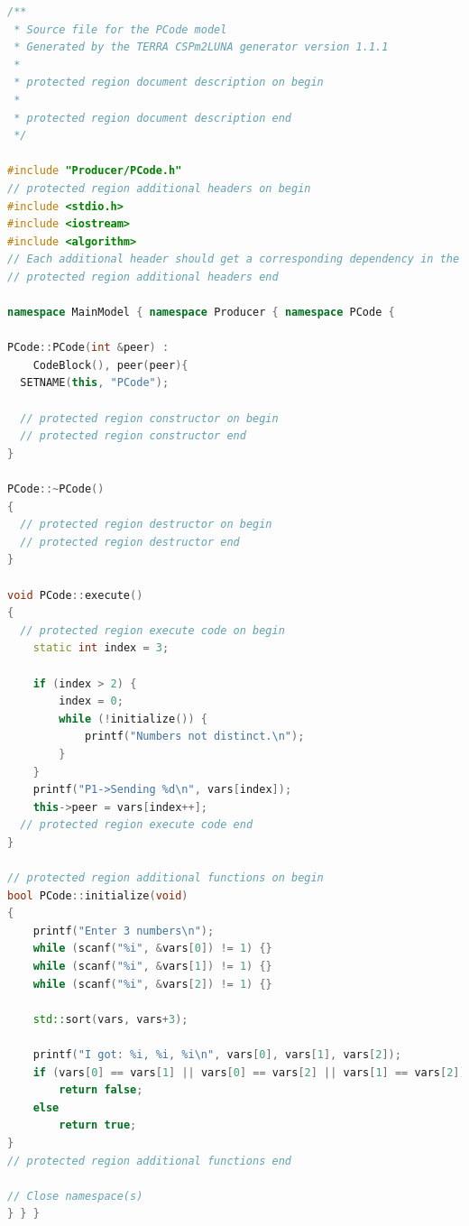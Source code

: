 \documentclass[a4paper,twoside,11pt]{article}
\begin{document}
\begin{lstlisting}[caption=Producer/PCode.cpp, label=code:2_1PCode, language=C++]
/**
 * Source file for the PCode model
 * Generated by the TERRA CSPm2LUNA generator version 1.1.1
 *
 * protected region document description on begin
 *
 * protected region document description end
 */

#include "Producer/PCode.h"
// protected region additional headers on begin
#include <stdio.h>
#include <iostream>
#include <algorithm>
// Each additional header should get a corresponding dependency in the Makefile
// protected region additional headers end

namespace MainModel { namespace Producer { namespace PCode { 

PCode::PCode(int &peer) :
    CodeBlock(), peer(peer){
  SETNAME(this, "PCode");

  // protected region constructor on begin
  // protected region constructor end
}

PCode::~PCode()
{
  // protected region destructor on begin
  // protected region destructor end
}

void PCode::execute()
{
  // protected region execute code on begin
	static int index = 3;

	if (index > 2) {
		index = 0;
		while (!initialize()) {
			printf("Numbers not distinct.\n");
		}
	}
	printf("P1->Sending %d\n", vars[index]);
	this->peer = vars[index++];
  // protected region execute code end
}

// protected region additional functions on begin
bool PCode::initialize(void)
{
	printf("Enter 3 numbers\n");
	while (scanf("%i", &vars[0]) != 1) {}
	while (scanf("%i", &vars[1]) != 1) {}
	while (scanf("%i", &vars[2]) != 1) {}

	std::sort(vars, vars+3);

	printf("I got: %i, %i, %i\n", vars[0], vars[1], vars[2]);
	if (vars[0] == vars[1] || vars[0] == vars[2] || vars[1] == vars[2])
		return false;
	else
		return true;
}
// protected region additional functions end

// Close namespace(s)
} } } 
\end{lstlisting}
\end{document}
